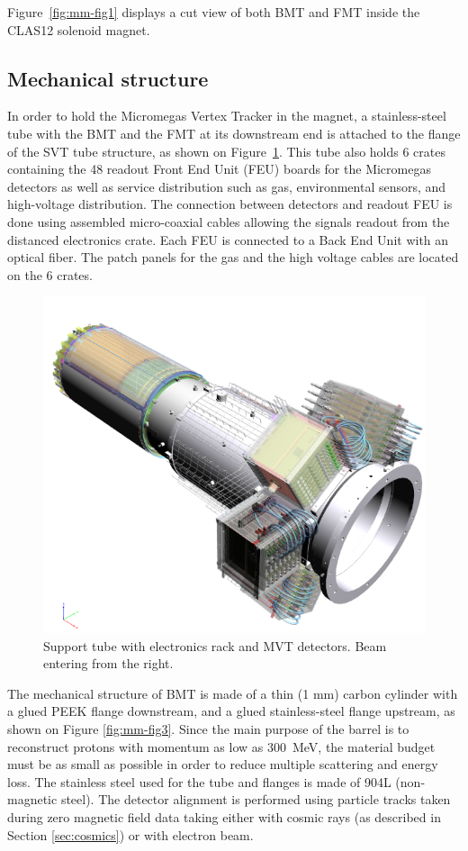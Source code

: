 Figure~\ref{fig:mm-fig1} displays a cut view of both BMT and FMT inside the CLAS12 solenoid magnet.

\subsection{Mechanical structure}
In order to hold the Micromegas Vertex Tracker in the magnet, a stainless-steel tube with the BMT and the FMT at its downstream end is attached to the flange of the SVT tube structure, as shown on Figure~\ref{fig:mm-fig2}. This tube also holds 6 crates containing the 48 readout Front End Unit (FEU) boards for the Micromegas detectors as well as service distribution such as gas, environmental sensors, and high-voltage distribution. The connection between detectors and readout FEU is done using assembled micro-coaxial cables allowing the signals readout from the distanced electronics crate. Each FEU is connected to a Back End Unit with an optical fiber. The patch panels for the gas and the high voltage cables are located on the 6 crates.

\begin{figure}[htb]
 \includegraphics[width=1.0\columnwidth,keepaspectratio]{images/fig2}
 \caption{Support tube with electronics rack and MVT detectors. Beam entering from the right.}
 \label{fig:mm-fig2}
\end{figure}

The mechanical structure of BMT is made of a thin (1 mm) carbon cylinder with a glued PEEK flange downstream, and a glued stainless-steel flange upstream, as shown on Figure \ref{fig:mm-fig3}. Since the main purpose of the barrel is to reconstruct protons with momentum as low as 300~MeV, the material budget must be as small as possible in order to reduce multiple scattering and energy loss.
The stainless steel used for the tube and flanges is made of 904L (non-magnetic steel). The detector alignment is performed using particle tracks taken during zero magnetic field data taking either with cosmic rays (as described in Section \ref{sec:cosmics}) or with electron beam.

